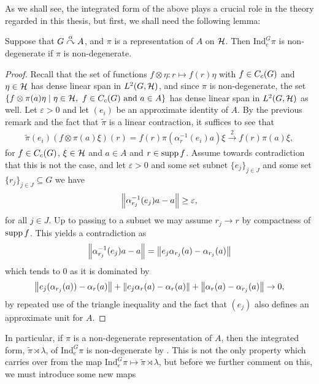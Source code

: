As we shall see, the integrated form of the above plays a crucial role in the theory regarded in this thesis, but first, we shall need the following lemma:
\begin{lemma}
Suppose that $G \stackrel{\alpha}{\curvearrowright} A$, and $\pi$ is a representation of $A$ on $\mathcal{H}$. Then $\mathrm{Ind}_e^G \pi$ is non-degenerate if $\pi$ is non-degenerate.
\label{cross:regrepnondeg}
\end{lemma}
\begin{proof}
Recall that the set of functions $f \otimes \eta \colon r \mapsto f(r) \eta$ with $f \in C_c(G)$ and $\eta \in \mathcal{H}$ has dense linear span in $L^2(G,\mathcal{H})$, and since $\pi$ is non-degenerate, the set $\{ f \otimes \pi(a) \eta \mid \eta \in \mathcal{H}, \ f \in C_c(G) \text{ and } a \in A \}$ has dense linear span in $L^2(G, \mathcal{H})$ as well. Let $\varepsilon > 0$ and let $(e_i)$ be an approximate identity of $A$. By the previous remark and the fact that $\tilde{\pi}$ is a linear contraction, it suffices to see that 
\begin{align*}
	\tilde{\pi}(e_i) (f \otimes \pi(a) \xi)(r)=f(r) \pi(\alpha_{r}^{-1}(e_i)a) \xi   \stackrel 2 \to f(r) \pi(a) \xi,
\end{align*}
for $f \in C_c(G)$, $\xi \in \mathcal{H}$ and $a \in A$ and $r \in \operatorname{supp} f$. Assume towards contradiction that this is not the case, and let $\varepsilon > 0$ and some set subnet $\{e_j\}_{j \in J}$ and some set $\{r_j\}_{j \in J} \subseteq G$ we have
\begin{align*}
	\left\lVert \alpha_{r_j}^{-1}(e_j)a - a \right\rVert \geq \varepsilon,
\end{align*}
for all $j \in J$. Up to passing to a subnet we may assume $r_j \to r$ by compactness of $\operatorname{supp} f$. This yields a contradiction as
\begin{align*}
	\left\lVert \alpha_{r_j}^{-1}(e_j)a - a \right\rVert  = \left\lVert e_j \alpha_{r_j}(a) -\alpha_{r_j}(a) \right\rVert 
\end{align*}
which tends to $0$ as it is dominated by
\begin{align*}
	\left\lVert e_j(\alpha_{r_j}(a)) - \alpha_r(a) \right\rVert + \left\lVert e_j \alpha_r(a) - \alpha_r(a) \right\rVert + \left\lVert \alpha_r(a) - \alpha_{r_j}(a)\right\rVert \to 0,
\end{align*}
by repeated use of the triangle inequality and the fact that $(e_j)$ also defines an approximate unit for $A$.
\end{proof}
\begin{remark}
In particular, if $\pi$ is a non-degenerate representation of $A$, then the integrated form, $\tilde{\pi} \rtimes \lambda$, of $\mathrm{Ind}_e^G \pi$ is non-degenerate by . This is not the only property which carries over from the map $\mathrm{Ind}_e^G \pi \mapsto \tilde{\pi} \rtimes \lambda$, but before we further comment on this, we must introduce some new maps
\end{remark}
